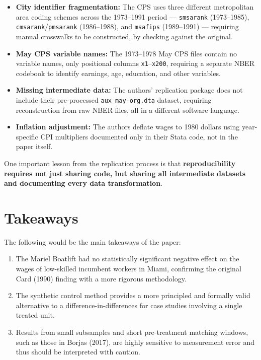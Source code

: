 \documentclass[12pt]{article}
\begin{document}
\begin{itemize}
   \item \textbf{City identifier fragmentation:} The CPS uses three
    different metropolitan area coding schemes across the 1973--1991
    period --- \texttt{smsarank} (1973--1985), \texttt{cmsarank}/\texttt{pmsarank}
    (1986--1988), and \texttt{msafips} (1989--1991) --- requiring manual
    crosswalks to be constructed, by checking against the original.
    \item \textbf{May CPS variable names:} The 1973--1978 May CPS files
    contain no variable names, only positional columns \texttt{x1}--\texttt{x200},
    requiring a separate NBER codebook to identify earnings, age, education,
    and other variables.
    \item \textbf{Missing intermediate data:} The authors' replication
    package does not include their pre-processed \texttt{aux\_may-org.dta}
    dataset, requiring reconstruction from raw NBER files, all in a different software language.
    \item \textbf{Inflation adjustment:} The authors deflate wages to
    1980 dollars using year-specific CPI multipliers documented only
    in their Stata code, not in the paper itself.
\end{itemize}

One important lesson from the replication process is that \textbf{reproducibility
requires not just sharing code, but sharing all intermediate datasets and
documenting every data transformation}.

\section{Takeaways}

The following would be the main takeaways of the paper:

\begin{enumerate}
\item The Mariel Boatlift had no statistically significant negative
    effect on the wages of low-skilled incumbent workers in Miami,
    confirming the original Card (1990) finding with a more rigorous
    methodology.
    \item The synthetic control method provides a more principled and
    formally valid alternative to a difference-in-differences
    for case studies involving a single treated unit.
    \item Results from small subsamples and short pre-treatment matching
    windows, such as those in Borjas (2017), are highly sensitive to measurement
    error and thus should be interpreted with caution.
\end{enumerate}
\end{document}
